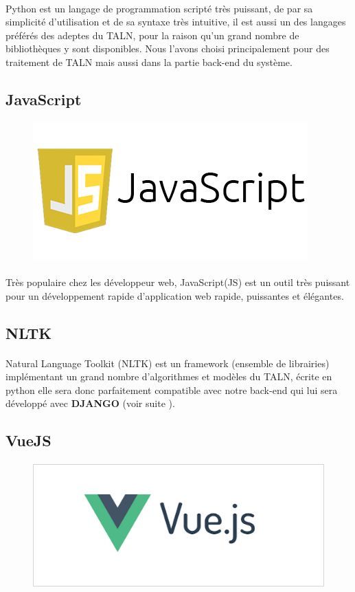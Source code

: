 \documentclass[]{report}
\begin{document}
			\paragraph{}
			Python est un langage de programmation scripté très puissant, de par sa simplicité d'utilisation et de sa syntaxe
			très intuitive, il est aussi un des langages préférés des adeptes du TALN, pour la raison qu'un grand nombre de 
			bibliothèques y sont disponibles. Nous l'avons choisi principalement pour des traitement de TALN mais aussi dans la partie
			back-end  du système.
		\subsection{JavaScript}
			\begin{figure}[H]
				\centering
				\includegraphics[width=0.25\linewidth]{images/js.png}
			\end{figure}
			\paragraph{}
			Très populaire chez les développeur web, JavaScript(JS) est un outil très puissant pour un développement rapide d'application web rapide, puissantes et élégantes.
		\subsection{NLTK}
			\paragraph{}
			 Natural Language Toolkit (NLTK) est un framework (ensemble de librairies) implémentant un grand nombre d'algorithmes et modèles du TALN, écrite en python elle sera donc parfaitement compatible avec notre back-end qui lui sera développé avec \textbf{DJANGO} (voir suite ).
		\subsection{VueJS}
			\paragraph{}
			\begin{figure}[H]
				\centering
				\includegraphics[width=0.35\linewidth]{images/vjs.png}
			\end{figure}
\end{document}
